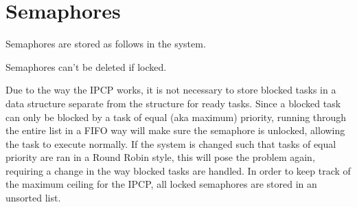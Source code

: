 \section{Semaphores}
Semaphores are stored as follows in the system.

Semaphores can't be deleted if locked. 
    
Due to the way the IPCP works, it is not necessary to store blocked
tasks in a data structure separate from the structure for ready tasks.
Since a blocked task can only be blocked by a task of equal (aka
maximum) priority, running through the entire list in a FIFO way will
make sure the semaphore is unlocked, allowing the task to execute
normally. If the system is changed such that tasks of equal priority are
ran in a Round Robin style, this will pose the problem again, requiring
a change in the way blocked tasks are handled. In order to keep track of
the maximum ceiling for the IPCP, all locked semaphores are stored in an
unsorted list.


